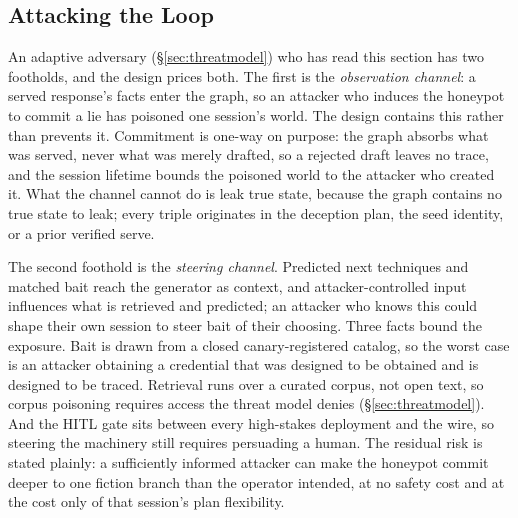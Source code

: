 \subsection{Attacking the Loop}
\label{sec:attack}
An adaptive adversary (\S\ref{sec:threatmodel}) who has read this
section has two footholds, and the design prices both. The first is the
\emph{observation channel}: a served response's facts enter the graph,
so an attacker who induces the honeypot to commit a lie has poisoned one
session's world. The design contains this rather than prevents it.
Commitment is one-way on purpose: the graph absorbs what was served,
never what was merely drafted, so a rejected draft leaves no trace, and
the session lifetime bounds the poisoned world to the attacker who
created it. What the channel cannot do is leak true state, because the
graph contains no true state to leak; every triple originates in the
deception plan, the seed identity, or a prior verified serve.

The second foothold is the \emph{steering channel}. Predicted next
techniques and matched bait reach the generator as context, and
attacker-controlled input influences what is retrieved and predicted;
an attacker who knows this could shape their own session to steer bait
of their choosing. Three facts bound the exposure. Bait is drawn from a
closed canary-registered catalog, so the worst case is an attacker
obtaining a credential that was designed to be obtained and is designed
to be traced. Retrieval runs over a curated corpus, not open text, so
corpus poisoning requires access the threat model denies
(\S\ref{sec:threatmodel}). And the HITL gate sits between every
high-stakes deployment and the wire, so steering the machinery still
requires persuading a human. The residual risk is stated plainly: a
sufficiently informed attacker can make the honeypot commit deeper to
one fiction branch than the operator intended, at no safety cost and at
the cost only of that session's plan flexibility.
